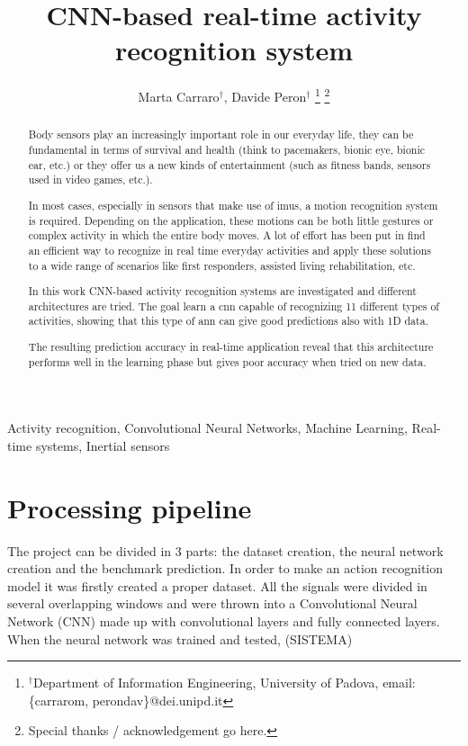 \documentclass[10pt, conference, letterpaper]{IEEEtran}
\title{CNN-based real-time activity recognition system}
\author{Marta Carraro$^\dag$, Davide Peron$^\dag$
\thanks{$^\dag$Department of Information Engineering, University of Padova, email: \{carrarom, perondav\}@dei.unipd.it}
\thanks{Special thanks / acknowledgement go here.}
}
\begin{document}
\maketitle

\begin{abstract}
Body sensors play an increasingly important role in our everyday life, they can be fundamental in terms of survival and health (think to pacemakers, bionic eye, bionic ear, etc.) or they offer us a new kinds of entertainment (such as fitness bands, sensors used in video games, etc.).

In most cases, especially in sensors that make use of \glspl{imu}, a motion recognition system is required. Depending on the application, these motions can be both little gestures or complex activity in which the entire body moves.
A lot of effort has been put in find an efficient way to recognize in real time everyday activities and apply these solutions to a wide range of scenarios like first responders, assisted living rehabilitation, etc.

In this work CNN-based activity recognition systems are investigated and different architectures are tried. The goal learn a \gls{cnn} capable of recognizing 11 different types of activities, showing that this type of \gls{ann} can give good predictions also with 1D data.

The resulting prediction accuracy in real-time application reveal that this architecture performs well in the learning phase but gives poor accuracy when tried on new data.
\end{abstract}





\IEEEkeywords
Activity recognition, Convolutional Neural Networks, Machine Learning, Real-time systems, Inertial sensors
\endIEEEkeywords


\section{Processing pipeline}
The project can be divided in 3 parts: the dataset creation, the neural network creation and the benchmark prediction.
In order to make an action recognition model it was firstly created a proper dataset. All the signals were divided in several overlapping windows and were thrown into a Convolutional Neural Network (CNN) made up with convolutional layers and fully connected layers.
When the neural network was trained and tested, (SISTEMA)
\end{document}
